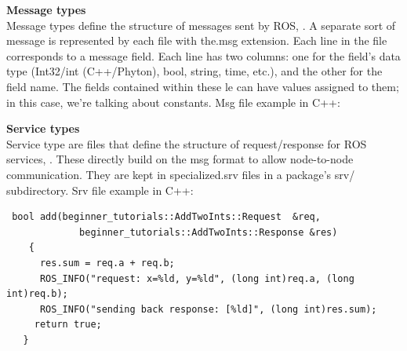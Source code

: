 \textbf{Message types}\\
Message types define the structure of messages sent by ROS, \citet{rosmsg}. A separate sort of message is represented by each file with the.msg extension. Each line in the file corresponds to a message field. Each line has two columns: one for the field's data type (Int32/int (C++/Phyton), bool, string, time, etc.), and the other for the field name. The fields contained within these le can have values assigned to them; in this case, we're talking about constants. Msg file example in C++:

\textbf{Service types}\\
Service type are files that define the structure of request/response for ROS services, \citet{rossrv}.
These directly build on the msg format to allow node-to-node communication. They are kept in specialized.srv files in a package's srv/ subdirectory.
Srv file example in C++:
\begin{verbatim}
 bool add(beginner_tutorials::AddTwoInts::Request  &req,
             beginner_tutorials::AddTwoInts::Response &res)
    {
      res.sum = req.a + req.b;
      ROS_INFO("request: x=%ld, y=%ld", (long int)req.a, (long int)req.b);
      ROS_INFO("sending back response: [%ld]", (long int)res.sum);
     return true;
   }
\end{verbatim}


